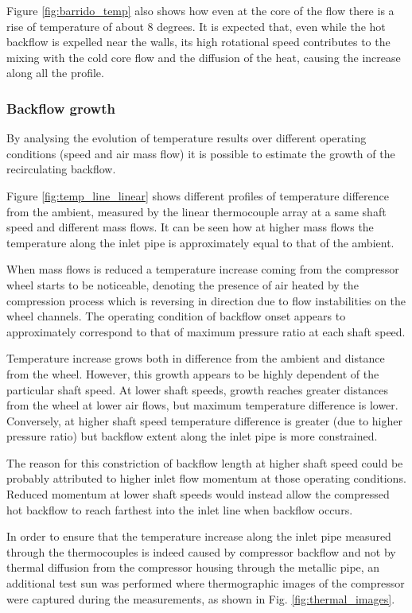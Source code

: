 Figure \ref{fig:barrido_temp} also shows how even at the core of the flow there is a rise of temperature of about 8 degrees. It is expected that, even while the hot backflow is expelled near the walls, its high rotational speed contributes to the mixing with the cold core flow and the diffusion of the heat, causing the increase along all the profile. 

\subsubsection{Backflow growth}

By analysing the evolution of temperature results over different operating conditions (speed and air mass flow) it is possible to estimate the growth of the recirculating backflow.

Figure \ref{fig:temp_line_linear} shows different profiles of temperature difference from the ambient, measured by the linear thermocouple array at a same shaft speed and different mass flows. It can be seen how at higher mass flows the temperature along the inlet pipe is approximately equal to that of the ambient.

When mass flows is reduced a temperature increase coming from the compressor wheel starts to be noticeable, denoting the presence of air heated by the compression process which is reversing in direction due to flow instabilities on the wheel channels. The operating condition of backflow onset appears to approximately correspond to that of maximum pressure ratio at each shaft speed.

Temperature increase grows both in difference from the ambient and distance from the wheel. However, this growth appears to be highly dependent of the particular shaft speed. At lower shaft speeds, growth reaches greater distances from the wheel at lower air flows, but maximum temperature difference is lower. Conversely, at higher shaft speed temperature difference is greater (due to higher pressure ratio) but backflow extent along the inlet pipe is more constrained.

The reason for this constriction of backflow length at higher shaft speed could be probably attributed to higher inlet flow momentum at those operating conditions. Reduced momentum at lower shaft speeds would instead allow the compressed hot backflow to reach farthest into the inlet line when backflow occurs. 

In order to ensure that the temperature increase along the inlet pipe measured through the thermocouples is indeed caused by compressor backflow and not by thermal diffusion from the compressor housing through the metallic pipe, an additional test sun was performed where thermographic images of the compressor were captured during the measurements, as shown in Fig. \ref{fig:thermal_images}.

